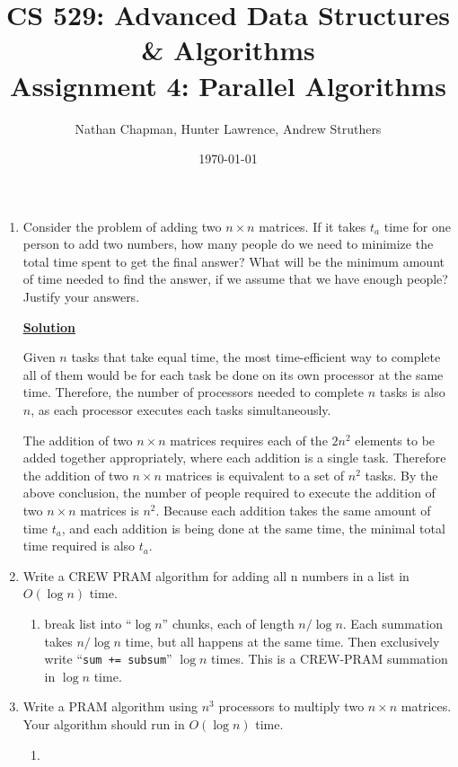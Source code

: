 \documentclass{article}
\title{\vspace*{-0.625in}CS 529: Advanced Data Structures \& Algorithms \\ Assignment 4: Parallel Algorithms}
\author{Nathan Chapman, Hunter Lawrence, Andrew Struthers}
\date{\today}
\renewcommand{\_}{\ifincsname_\else\legacyunderscore\fi}
\begin{document}
    \maketitle

\begin{enumerate}
	\item Consider the problem of adding two $n\times n$ matrices. If it takes $t_a$ time for one person to add two numbers, how many people do we need to minimize the total time spent to get the final answer? What will be the minimum amount of time needed to find the answer, if we assume that we have enough people? Justify your answers.
	
        \underline{\textbf{Solution}}

        Given $n$ tasks that take equal time, the most time-efficient way to complete all of them would be for each task be done on its own processor at the same time.  Therefore, the number of processors needed to complete $n$ tasks is also $n$, as each processor executes each tasks simultaneously.

        The addition of two $n \times n$ matrices requires each of the $2 n^2$ elements to be added together appropriately, where each addition is a single task.  Therefore the addition of two $n \times n$ matrices is equivalent to a set of $n^2$ tasks.  By the above conclusion, the number of people required to execute the addition of two $n \times n$ matrices is $n^2$. Because each addition takes the same amount of time $t_a$, and each addition is being done at the same time, the minimal total time required is also $t_a$.

	\item Write a CREW PRAM algorithm for adding all n numbers in a list in $O(\log n)$ time.
	\begin{enumerate}
		\item break list into ``$\log n$'' chunks, each of length $n / \log n$.  Each summation takes $n / \log n$ time, but all happens at the same time.  Then exclusively write ``\verb|sum += subsum|'' $\log n$ times.  This is a CREW-PRAM summation in $\log n$ time.
	\end{enumerate}

	\item Write a PRAM algorithm using $n^3$ processors to multiply two $n\times n$ matrices. Your algorithm should run in $O(\log n)$ time.
	\begin{enumerate}
		\item
	\end{enumerate}

\end{enumerate}
\end{document}
